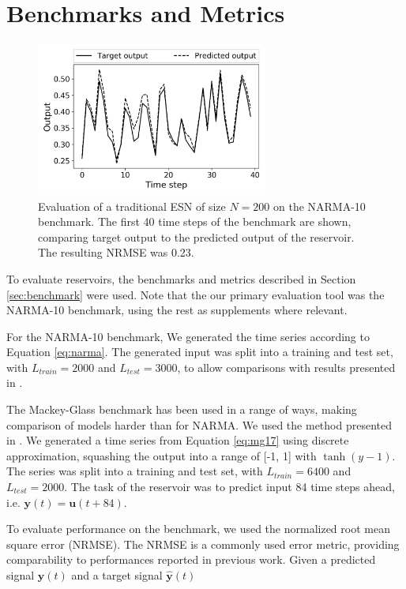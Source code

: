 \section{Benchmarks and Metrics}
\label{sec:bench-metr}

\begin{figure}[t!]
  \centering
  \includegraphics[width=3.0in]{figures/benchmark-example.png}
  \caption{
    Evaluation of a traditional ESN of size $N = 200$ on the NARMA-10
benchmark. The first 40 time steps of the benchmark are shown, comparing target
output to the predicted output of the reservoir. The resulting NRMSE was 0.23.
  }
  \label{fig:benchmark-example}
\end{figure}

To evaluate reservoirs, the benchmarks and metrics described in Section
\ref{sec:benchmark} were used. Note that the our primary evaluation tool was the
NARMA-10 benchmark, using the rest as supplements where relevant.

For the NARMA-10 benchmark, We generated the time series according to Equation
\ref{eq:narma}. The generated input was split into a training and test set, with
$L_{train} = 2000$ and $L_{test} = 3000$, to allow comparisons with results
presented in \cite{rodan_minimum_2011}.

The Mackey-Glass benchmark has been used in a range of ways, making comparison
of models harder than for NARMA. We used the method presented in
\cite{ma_deep-esn:_2017}. We generated a time series from Equation \ref{eq:mg17}
using discrete approximation, squashing the output into a range of [-1, 1] with
$\tanh(y-1)$. The series was split into a training and test set, with $L_{train}
= 6400$ and $L_{test} = 2000$. The task of the reservoir was to predict input 84
time steps ahead, i.e. $\mathbf{y}(t) = \mathbf{u}(t+84)$.

To evaluate performance on the benchmark, we used the normalized root mean
square error (NRMSE). The NRMSE is a commonly used error metric, providing
comparability to performances reported in previous work. Given a predicted
signal $\mathbf{y}(t)$ and a target signal $\mathbf{\hat{y}}(t)$

